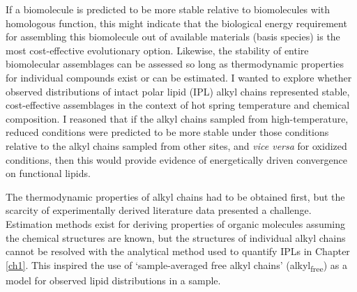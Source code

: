 If a biomolecule is predicted to be more stable relative to biomolecules with homologous function, this might indicate that the biological energy requirement for assembling this biomolecule out of available materials (basis species) is the most cost-effective evolutionary option. Likewise, the stability of entire biomolecular assemblages can be assessed so long as thermodynamic properties for individual compounds exist or can be estimated. I wanted to explore whether observed distributions of intact polar lipid (IPL) alkyl chains represented stable, cost-effective assemblages in the context of hot spring temperature and chemical composition. I reasoned that if the alkyl chains sampled from high-temperature, reduced conditions were predicted to be more stable under those conditions relative to the alkyl chains sampled from other sites, and \textit{vice versa} for oxidized conditions, then this would provide evidence of energetically driven convergence on functional lipids.

The thermodynamic properties of alkyl chains had to be obtained first, but the scarcity of experimentally derived literature data presented a challenge. Estimation methods exist for deriving properties of organic molecules assuming the chemical structures are known, but the structures of individual alkyl chains cannot be resolved with the analytical method used to quantify IPLs in Chapter \ref{ch1}. This inspired the use of `sample-averaged free alkyl chains' (alkyl\textsubscript{free}) as a model for observed lipid distributions in a sample.

